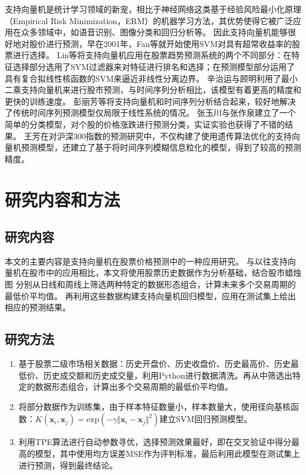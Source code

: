 支持向量机是统计学习领域的新宠，相比于神经网络这类基于经验风险最小化原理（Empirical Risk Minimization，ERM）的机器学习方法，其优势使得它被广泛应用在众多领域中，如语音识别\cite{en4}、图像分类\cite{en5}和回归分析\cite{cn16}等。
因此支持向量机能够很好地对股价进行预测，早在2001年，Fan等就开始使用SVM对具有超常收益率的股票进行选择\cite{en6}。
Lin等将支持向量机应用在股票趋势预测系统的两个不同部分：在特征选择部分选用了SVM过滤器来对特征进行排名和选择；在预测模型部分运用了具有复合拟线性核函数的SVM来逼近非线性分离边界\cite{en7}。
辛治运与顾明利用了最小二乘支持向量机来进行股市预测，与时间序列分析相比，该模型有着更高的精度和更快的训练速度\cite{cn17}。
彭丽芳等将支持向量机和时间序列分析结合起来，较好地解决了传统时间序列预测模型仅局限于线性系统的情况\cite{cn18}。
张玉川与张作泉建立了一个简单的分类模型，对个股的价格涨跌进行预测分类，实证实验也获得了不错的结果\cite{cn19}。
王芳在对沪深300指数的预测研究中，不仅构建了使用遗传算法优化的支持向量机预测模型，还建立了基于将时间序列模糊信息粒化的模型，得到了较高的预测精度\cite{cn20}。

\section{研究内容和方法}

\subsection{研究内容}

本文的主要内容是支持向量机在股票价格预测中的一种应用研究。
与以往支持向量机在股市中的应用相比，本文将使用股票历史数据作为分析基础，结合股市蜡烛图
分别从日线和周线上筛选两种特定的数据形态组合，计算未来多个交易周期的最低价平均值。
再利用这些数据构建支持向量机回归模型，应用在测试集上给出相应的预测结果。

\subsection{研究方法}

\begin{enumerate}
    \item 基于股票二级市场相关数据：历史开盘价、历史收盘价、历史最高价、历史最低价、历史成交额和历史成交量，利用Python进行数据清洗。再从中筛选出特定的数据形态组合，计算出多个交易周期的最低价平均值。
    \item 将部分数据作为训练集，由于样本特征数量小，样本数量大，使用径向基核函数：$K(\mathbf{x}_i,\mathbf{x}_j)=\mathrm{exp}(-\gamma\Vert\mathbf{x}_i-\mathbf{x}_j\Vert^2)$建立SVM回归预测模型。
    \item 利用TPE算法进行自动参数寻优，选择预测效果最好，即在交叉验证中得分最高的模型，其中使用均方误差MSE作为评判标准，最后利用此模型在测试集上进行预测，得到最终结论。
\end{enumerate}